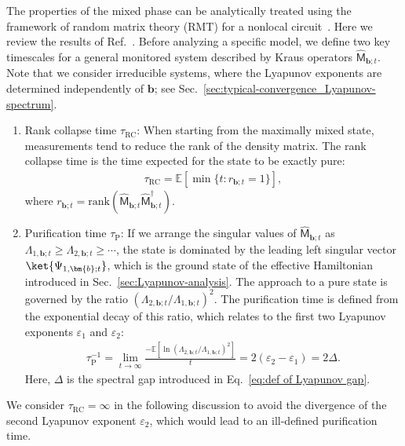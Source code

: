 \documentclass[preprint,pteplogo]{ptephy_v2}%
\numberwithin{equation}{section}
\theoremstyle{definition}
\begin{document}
The properties of the mixed phase can be analytically treated using the framework of random matrix theory (RMT) for a nonlocal circuit~\cite{bulchandani2024random, DeLuca2025universality}.
Here we review the results of Ref.~\cite{bulchandani2024random}. 
Before analyzing a specific model, we define two key timescales for a general monitored system described by Kraus operators $\hat{\mathsf{M}}_{\bm{b};t}$.
Note that we consider irreducible systems, where the Lyapunov exponents are determined  independently of $\bm{b}$;
see Sec.~\ref{sec:typical-convergence_Lyapunov-spectrum}.

\begin{enumerate}
    \item Rank collapse time $\tau_{\mathrm{RC}}$:
    When starting from the maximally mixed state, measurements tend to reduce the rank of the density matrix.
    The rank collapse time is the time expected for the state to be exactly pure:
    \begin{align} \label{eq:RankCollapseTime}
        \tau_{\mathrm{RC}} = \mathbb{E}[\min\{t:r_{\bm{b};t}=1\}],
    \end{align}
    where $r_{\bm{b};t}=\mathrm{rank}(\hat{\mathsf{M}}_{\bm{b};t}\hat{\mathsf{M}}_{\bm{b};t}^\dagger)$.

    \item Purification time $\tau_\mathrm{P}$:
    If we arrange the singular values of $\hat{\mathsf{M}}_{\bm{b};t}$ as $\Lambda_{1, \bm{b};t}\geq\Lambda_{2, \bm{b};t}\geq\cdots$, the state is dominated by the leading left singular vector $\ket{\Psi_{1, \bm{b};t}}$, which is the ground state of the effective Hamiltonian introduced in Sec.~\ref{sec:Lyapunov-analysis}.
    The approach to a pure state is governed by the ratio $(\Lambda_{2,\bm{b};t}/\Lambda_{1,\bm{b};t})^2$.
    The purification time is defined from the exponential decay of this ratio, which relates to the first two Lyapunov exponents $\varepsilon_1$ and $\varepsilon_2$:
    \begin{align}
        \tau_\mathrm{P}^{-1} = \lim_{t\to\infty}\frac{-\mathbb{E}[\ln(\Lambda_{2,\bm{b};t}/\Lambda_{1,\bm{b};t})^2]}{t} = 2(\varepsilon_2 - \varepsilon_1)
        = 2 \Delta.
        \label{eq:def of purification time}
    \end{align}
    Here, $\Delta$ is the spectral gap introduced in Eq.~\eqref{eq:def of Lyapunov gap}.
\end{enumerate}
We consider $\tau_\mathrm{RC}=\infty$ in the following discussion to avoid the divergence of the second Lyapunov exponent $\varepsilon_2$, which would lead to an ill-defined purification time.
\end{document}
